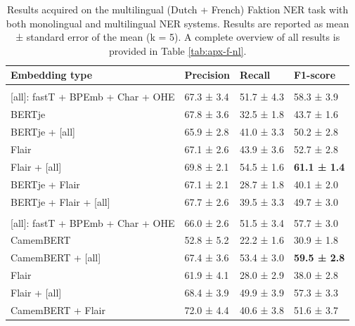 \documentclass[12pt,a4paper,]{book}
\begin{document}
\begin{table}
\caption{\label{tab:faktion-bi-tab}Results acquired on the multilingual (Dutch + French) Faktion NER task with both monolingual and multilingual NER systems. Results are reported as mean ± standard error of the mean (k = 5). A complete overview of all results is provided in Table \ref{tab:apx-f-nl}.}
\centering
\begin{tabular}[t]{llll}
\toprule
Embedding type & Precision & Recall & F1-score\\
\midrule
\addlinespace[0.3em]
\multicolumn{4}{l}{\textbf{Monolingual Dutch embeddings}}\\
\hspace{1em}[all]: fastT + BPEmb + Char + OHE & 67.3 ± 3.4 & 51.7 ± 4.3 & 58.3 ± 3.9\\
\hspace{1em}BERTje & 67.8 ± 3.6 & 32.5 ± 1.8 & 43.7 ± 1.6\\
\hspace{1em}BERTje + [all] & 65.9 ± 2.8 & 41.0 ± 3.3 & 50.2 ± 2.8\\
\hspace{1em}Flair & 67.1 ± 2.6 & 43.9 ± 3.6 & 52.7 ± 2.8\\
\hspace{1em}Flair + [all] & 69.8 ± 2.1 & 54.5 ± 1.6 & \textbf{61.1 ± 1.4}\\
\hspace{1em}BERTje + Flair & 67.1 ± 2.1 & 28.7 ± 1.8 & 40.1 ± 2.0\\
\hspace{1em}BERTje + Flair + [all] & 67.7 ± 2.6 & 39.5 ± 3.3 & 49.7 ± 3.0\\
\addlinespace[0.3em]
\multicolumn{4}{l}{\textbf{Monolingual French embeddings}}\\
\hspace{1em}[all]: fastT + BPEmb + Char + OHE & 66.0 ± 2.6 & 51.5 ± 3.4 & 57.7 ± 3.0\\
\hspace{1em}CamemBERT & 52.8 ± 5.2 & 22.2 ± 1.6 & 30.9 ± 1.8\\
\hspace{1em}CamemBERT + [all] & 67.4 ± 3.6 & 53.4 ± 3.0 & \textbf{59.5 ± 2.8}\\
\hspace{1em}Flair & 61.9 ± 4.1 & 28.0 ± 2.9 & 38.0 ± 2.8\\
\hspace{1em}Flair + [all] & 68.4 ± 3.9 & 49.9 ± 3.9 & 57.3 ± 3.3\\
\hspace{1em}CamemBERT + Flair & 72.0 ± 4.4 & 40.6 ± 3.8 & 51.6 ± 3.7\\

\end{tabular}
\end{table}
\end{document}
